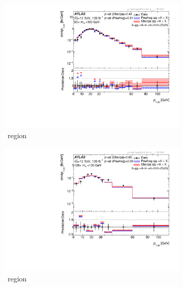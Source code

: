 \begin{figure}[htb!]
    \begin{subfigure}{.49\textwidth}\centering
      \includegraphics[width=.99\linewidth]{Figures/m4l/UnfoldedResults/linlog_Unfolded_Data_pt34_m4l60-100.pdf}\caption{\ZFourL \ region}\label{fig:sub-first}
    \end{subfigure}
    \begin{subfigure}{.49\textwidth}\centering
      \includegraphics[width=.99\linewidth]{Figures/m4l/UnfoldedResults/linlog_Unfolded_Data_pt34_m4l120-130.pdf} \caption{\HFourL \ region}\label{fig:sub-second}
    \end{subfigure}
    \begin{subfigure}{.49\textwidth}\centering

\end{subfigure}
\end{figure}
